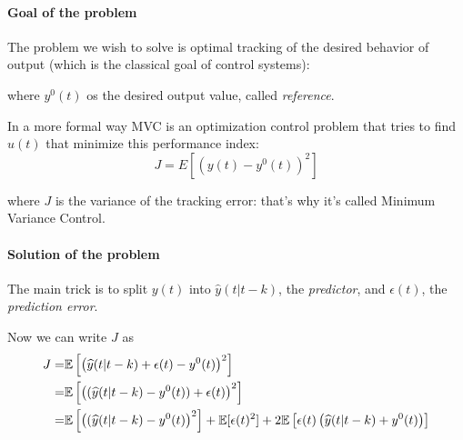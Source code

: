 \paragraph{Goal of the problem} 
The problem we wish to solve is optimal tracking of the desired behavior of output (which is the classical goal of control systems):
\begin{figure}[H]
    \centering
\end{figure}
where $y^0(t)$ os the desired output value, called \emph{reference}. 

In a more formal way MVC is an optimization control problem that tries to find $u(t)$ that minimize this performance index:
\[
    J = E\left[ (y(t) - y^0(t))^2 \right]
\]

where $J$ is the variance of the tracking error: that's why it's called Minimum Variance Control.

\paragraph{Solution of the problem}
The main trick is to split $y(t)$ into $\hat{y}(t|t-k)$, the \emph{predictor}, and $\epsilon(t)$, the \emph{prediction error}.

Now we can write $J$ as 
\begin{align*}
	J =& \mathbb{E} \left[ \left( \widehat{y}(t|t-k) + \epsilon(t) - y^0(t) \right)^2 \right] \\
	  =& \mathbb{E} \left[ \left( (\widehat{y}(t|t-k) - y^0(t)) + \epsilon(t) \right)^2 \right] \\
	  =& \mathbb{E} \left[ \left( (\widehat{y}(t|t-k) - y^0(t) \right)^2 \right] + \mathbb{E} [\epsilon(t)^2 ] + 2 \mathbb{E} \left[ \epsilon(t) \left( \widehat{y}(t|t-k) + y^0(t) \right) \right] 
\end{align*}

